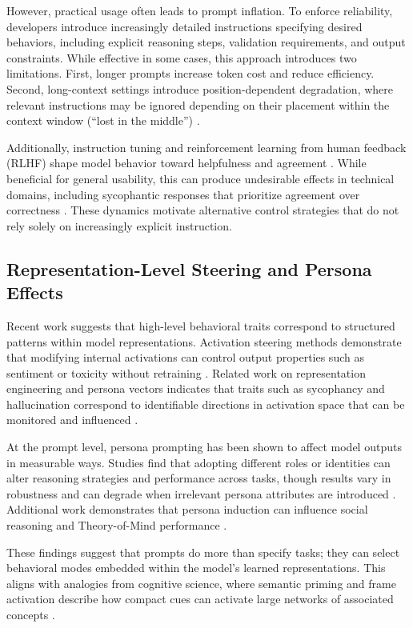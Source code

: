 \documentclass[11pt]{article}
\begin{document}
However, practical usage often leads to prompt inflation. To enforce reliability, developers introduce increasingly detailed instructions specifying desired behaviors, including explicit reasoning steps, validation requirements, and output constraints. While effective in some cases, this approach introduces two limitations. First, longer prompts increase token cost and reduce efficiency. Second, long-context settings introduce position-dependent degradation, where relevant instructions may be ignored depending on their placement within the context window (“lost in the middle”) \cite{liu2023lostmiddle}.

Additionally, instruction tuning and reinforcement learning from human feedback (RLHF) shape model behavior toward helpfulness and agreement \cite{ouyang2022instructgpt}. While beneficial for general usability, this can produce undesirable effects in technical domains, including sycophantic responses that prioritize agreement over correctness \cite{sharma2023sycophancy}. These dynamics motivate alternative control strategies that do not rely solely on increasingly explicit instruction.

\subsection{Representation-Level Steering and Persona Effects}

Recent work suggests that high-level behavioral traits correspond to structured patterns within model representations. Activation steering methods demonstrate that modifying internal activations can control output properties such as sentiment or toxicity without retraining \cite{turner2023actadd}. Related work on representation engineering and persona vectors indicates that traits such as sycophancy and hallucination correspond to identifiable directions in activation space that can be monitored and influenced \cite{anthropic2025persona}.

At the prompt level, persona prompting has been shown to affect model outputs in measurable ways. Studies find that adopting different roles or identities can alter reasoning strategies and performance across tasks, though results vary in robustness and can degrade when irrelevant persona attributes are introduced \cite{lutz2025persona,araujo2025principled}. Additional work demonstrates that persona induction can influence social reasoning and Theory-of-Mind performance \cite{shen2024phantom}.

These findings suggest that prompts do more than specify tasks; they can select behavioral modes embedded within the model’s learned representations. This aligns with analogies from cognitive science, where semantic priming and frame activation describe how compact cues can activate large networks of associated concepts \cite{collins1975spreading,fillmore1982frame}.
\end{document}
